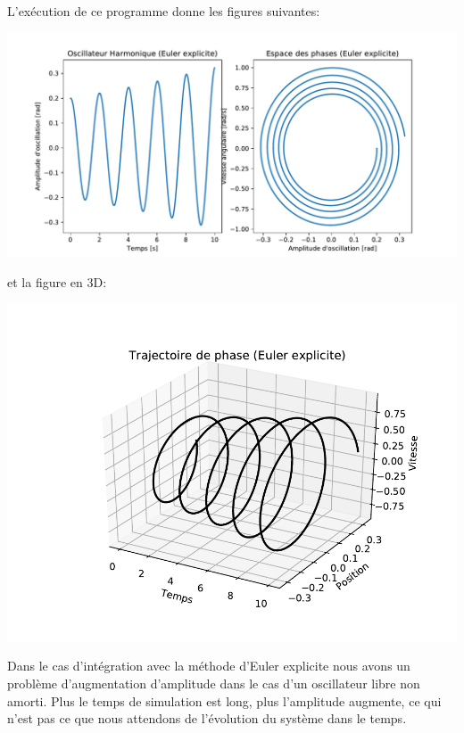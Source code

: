 \documentclass[%
oneside,                 %
final,                   %
10pt,french]{article}
\newenvironment{blockshaded}
{\def\FrameCommand{\fboxsep=3mm\colorbox{grayicon_block_background}}
 \MakeFramed {\advance\hsize-\width \FrameRestore}}{\endMakeFramed}
\newenvironment{block_grayiconadmon}[1][Block]{
\begin{blockshaded}
\noindent
 \textbf{#1}\par
\nobreak\noindent\ignorespaces
}
{
\end{blockshaded}
}
\newenvironment{doconceexercise}{}{}
\begin{document}
\begin{doconceexercise}
L'exécution de ce programme donne les figures suivantes:



\vspace{6mm}

\centerline{\includegraphics[width=1.0\linewidth]{scripts/Pendule_EulerExp1D.pdf}}

\vspace{6mm}



et la figure en 3D:



\vspace{6mm}

\centerline{\includegraphics[width=1.0\linewidth]{scripts/Pendule_EulerExp3D.pdf}}

\vspace{6mm}




\begin{block_grayiconadmon}[Remarque]
Dans le cas d'intégration avec la méthode d'Euler explicite nous avons un problème d’augmentation d’amplitude dans le cas d’un oscillateur libre non amorti. Plus le temps de simulation est long, plus l'amplitude augmente, ce qui n'est pas ce que nous attendons de l'évolution du système dans le temps.
\end{block_grayiconadmon} %




\end{doconceexercise}
\end{document}
